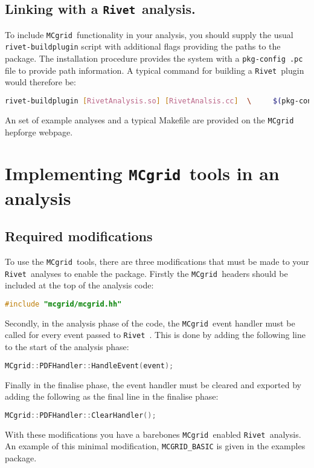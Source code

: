 \documentclass[11pt]{article}
\newcommand{\mcgrid} {{\tt MCgrid }}
\newcommand{\rivet} {{\tt Rivet }}
\begin{document}
\subsection{Linking with a \rivet analysis.}
To include \mcgrid functionality in your analysis, you should supply the usual \lstinline[language=bash]{rivet-buildplugin} script with additional flags providing the paths to the package. The installation procedure provides the system with a \lstinline[language=bash]{pkg-config .pc} file to provide path information. A typical command for building a \rivet plugin would therefore be:
\begin{lstlisting}[language=bash]
 rivet-buildplugin [RivetAnalysis.so] [RivetAnalsis.cc]  \     $(pkg-config mcgrid --cflags) $(pkg-config mcgrid --libs)
\end{lstlisting}
An set of example analyses and a typical Makefile are provided on the \mcgrid hepforge webpage.

\section{Implementing \mcgrid tools in an analysis}
\subsection{Required modifications}
To use the \mcgrid tools, there are three modifications that must be made to your \rivet analyses to enable the package.
Firstly the \mcgrid headers should be included at the top of the analysis code:
\begin{lstlisting}[language=c++]
	#include "mcgrid/mcgrid.hh"
\end{lstlisting}
Secondly, in the analysis phase of the code, the \mcgrid event handler must be called for every event passed to \rivet. This is done by adding the following line to the start of the analysis phase:
\begin{lstlisting}[language=c++]
	MCgrid::PDFHandler::HandleEvent(event);
\end{lstlisting}
Finally in the finalise phase, the event handler must be cleared and exported by adding the following as the final line in the finalise phase:
\begin{lstlisting}[language=c++]
	MCgrid::PDFHandler::ClearHandler();
\end{lstlisting}
With these modifications you have a barebones \mcgrid enabled \rivet analysis. An example of this minimal modification, \lstinline[language=bash]{MCGRID_BASIC} is given in the examples package.
\end{document}
